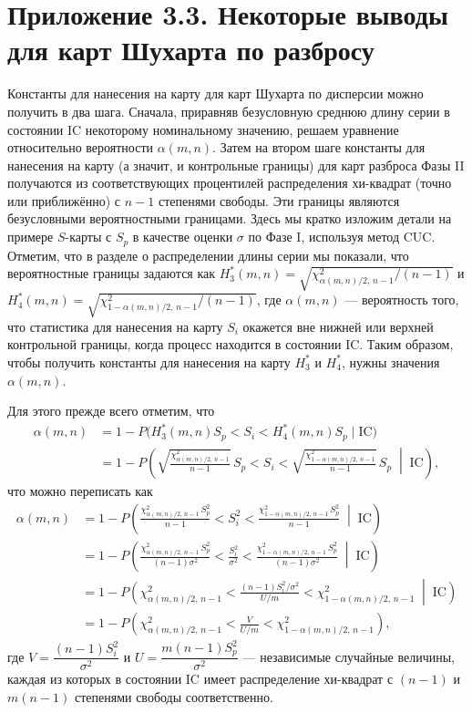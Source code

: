 \section*{Приложение 3.3. Некоторые выводы для карт Шухарта по разбросу}

Константы для нанесения на карту для карт Шухарта по дисперсии можно получить в два шага. Сначала, приравняв безусловную среднюю длину серии в состоянии IC некоторому номинальному значению, решаем уравнение относительно вероятности \(\alpha(m,n)\). Затем на втором шаге константы для нанесения на карту (а значит, и контрольные границы) для карт разброса Фазы II получаются из соответствующих процентилей распределения хи-квадрат (точно или приближённо) с \(n - 1\) степенями свободы. Эти границы являются безусловными вероятностными границами. Здесь мы кратко изложим детали на примере \(S\)-карты с \(S_p\) в качестве оценки \(\sigma\) по Фазе I, используя метод CUC. Отметим, что в разделе о распределении длины серии мы показали, что вероятностные границы задаются как \(H_3^*(m,n) = \sqrt{\chi^2_{\alpha(m,n)/2,\,n-1}/(n - 1)}\) и \(H_4^*(m,n) = \sqrt{\chi^2_{1-\alpha(m,n)/2,\,n-1}/(n - 1)}\), где \(\alpha(m,n)\) — вероятность того, что статистика для нанесения на карту \(S_i\) окажется вне нижней или верхней контрольной границы, когда процесс находится в состоянии IC. Таким образом, чтобы получить константы для нанесения на карту \(H_3^*\) и \(H_4^*\), нужны значения \(\alpha(m,n)\).

Для этого прежде всего отметим, что
\[
\begin{aligned}
	\alpha(m,n) &= 1 - P\big(H_3^*(m,n)S_p < S_i < H_4^*(m,n)S_p \mid \text{IC}\big) \\
	&= 1 - P\left(\sqrt{\frac{\chi^2_{\alpha(m,n)/2,\,n-1}}{n-1}}\,S_p < S_i
	< \sqrt{\frac{\chi^2_{1-\alpha(m,n)/2,\,n-1}}{n-1}}\,S_p \;\middle|\; \text{IC}\right),
\end{aligned}
\]
что можно переписать как
\[
\begin{aligned}
	\alpha(m,n)
	&= 1 - P\left(\frac{\chi^2_{\alpha(m,n)/2,\,n-1}\,S_p^2}{n-1} < S_i^2
	< \frac{\chi^2_{1-\alpha(m,n)/2,\,n-1}\,S_p^2}{n-1} \;\middle|\; \text{IC}\right) \\
	&= 1 - P\left(\frac{\chi^2_{\alpha(m,n)/2,\,n-1}\,S_p^2}{(n-1)\sigma^2} < \frac{S_i^2}{\sigma^2}
	< \frac{\chi^2_{1-\alpha(m,n)/2,\,n-1}\,S_p^2}{(n-1)\sigma^2} \;\middle|\; \text{IC}\right) \\
	&= 1 - P\left(\chi^2_{\alpha(m,n)/2,\,n-1} < \frac{(n-1)S_i^2/\sigma^2}{U/m}
	< \chi^2_{1-\alpha(m,n)/2,\,n-1} \;\middle|\; \text{IC}\right) \\
	&= 1 - P\left(\chi^2_{\alpha(m,n)/2,\,n-1} < \frac{V}{U/m}
	< \chi^2_{1-\alpha(m,n)/2,\,n-1}\right),
\end{aligned}
\]
где \(V = \dfrac{(n-1)S_i^2}{\sigma^2}\) и \(U = \dfrac{m(n-1)S_p^2}{\sigma^2}\) — независимые случайные величины, каждая из которых в состоянии IC имеет распределение хи-квадрат с \((n-1)\) и \(m(n-1)\) степенями свободы соответственно.

